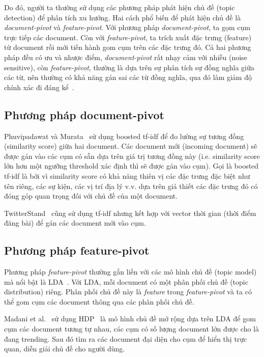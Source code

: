 Do đó, người ta thường sử dụng các phương pháp phát hiện chủ đề (topic detection) để phân tích xu hướng. Hai cách phổ biến để phát hiện chủ đề là \textit{document-pivot} và \textit{feature-pivot}. Với phương pháp \textit{document-pivot}, ta gọm cụm trực tiếp các \acrshort{document}. Còn với \textit{feature-pivot}, ta trích xuất đặc trưng (feature) từ \acrshort{document} rồi mới tiến hành gom cụm trên các đặc trưng đó. Cả hai phương pháp đều có ưu và nhược điểm, \textit{document-pivot} rất nhạy cảm với nhiễu (noise sensitive), còn \textit{feature-pivot}, thường là dựa trên sự phân tích sự đồng nghĩa giữa các từ, nên thường có khả năng gán sai các từ đồng nghĩa, qua đó làm giảm độ chính xác đi đáng kể~\cite{aielloSensingTrendingTopics2013}.

\subsection{Phương pháp document-pivot}
\label{chap:document-pivot}
Phuvipadawat và Murata~\cite{phuvipadawatBreakingNewsDetection2010} sử dụng boosted \acrfull{tf-idf} để đo lường sự tương đồng (similarity score) giữa hai \acrshort{document}. Các \acrshort{document} mới (incoming document) sẽ được gán vào các cụm có sẵn dựa trên giá trị tương đồng này (i.e. similarity score lớn hơn một ngưỡng threshold xác định thì sẽ được gán vào cụm). Gọi là boosted \acrshort{tf-idf} là bởi vì similarity score có khả năng thiên vị các đặc trưng đặc biệt như tên riêng, các sự kiện, các vị trí địa lý v.v. dựa trên giả thiết các đặc trưng đó có đóng góp quan trọng đối với chủ đề của một \acrshort{document}.

TwitterStand~\cite{sankaranarayananTwitterStandNewsTweets2009} cũng sử dụng \acrshort{tf-idf} nhưng kết hợp với vector thời gian (thời điểm đăng bài) để gán các \acrshort{document} mới vào cụm.

\subsection{Phương pháp feature-pivot}
Phương pháp \textit{feature-pivot} thường gắn liền với các mô hình chủ đề (topic model) mà nổi bật là \acrfull{LDA}~\cite{bleiLatentDirichletAllocation2003}. Với \acrshort{LDA}, mỗi \acrshort{document} có một phân phối chủ đề (topic distribution) riêng. Phân phối chủ đề này là \textit{feature} trong \textit{feature-pivot} và ta có thể gom cụm các \acrshort{document} thông qua các phân phối chủ đề.

Madani et al.~\cite{madaniRealtimeTrendingTopics2015} sử dụng \acrfull{HDP}~\cite{tehHierarchicalDirichletProcesses2012} là mô hình chủ đề mở rộng dựa trên \acrshort{LDA} để gom cụm các \acrshort{document} tương tự nhau, các cụm có số lượng \acrshort{document} lớn được cho là đang trending. Sau đó tìm ra các \acrshort{document} đại diện cho cụm để hiển thị trực quan, diễn giải chủ đề cho người dùng.

